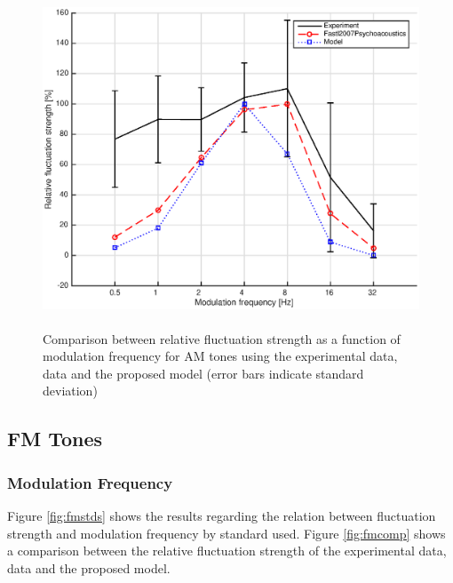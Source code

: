\documentclass[a4paper]{article}
\begin{document}
\begin{figure}[ht!]
    \centering
    \includegraphics[height=10cm]{img/AM_tones-fm-results-All-comparison}
    \caption{Comparison between relative fluctuation strength as a function of
        modulation frequency for AM tones using the experimental data,
        \citeauthor{Fastl2007Psychoacoustics} data and the proposed model
        (error bars indicate standard deviation)}
    \label{fig:amcomp}
\end{figure}

\subsection{FM Tones}

\subsubsection{Modulation Frequency}

Figure \ref{fig:fmstds} shows the results regarding the relation between
fluctuation strength and modulation frequency by standard used. Figure
\ref{fig:fmcomp} shows a comparison between the relative fluctuation strength
of the experimental data, \citeauthor{Fastl2007Psychoacoustics} data and the
proposed model.
\end{document}
